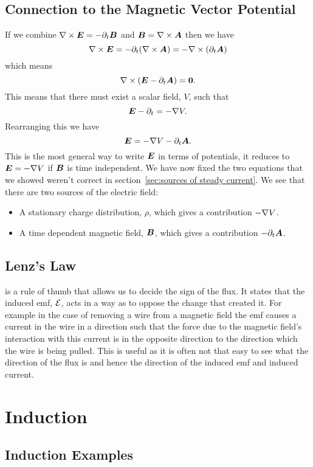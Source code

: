     \subsection{Connection to the Magnetic Vector Potential}
    If we combine \(\nabla\times\bm{E} = -\partial_t\bm{B}\) and \(\bm{B} = \nabla\times\bm{A}\) then we have
    \[\nabla\times\bm{E} = -\partial_t(\nabla\times\bm{A}) = -\nabla\times(\partial_t\bm{A})\]
    which means
    \[\nabla\times(\bm{E} - \partial_t\bm{A}) = \bm{0}.\]
    This means that there must exist a scalar field, \(V\), such that
    \[\bm{E} - \partial_t = -\nabla V.\]
    Rearranging this we have
    \[\bm{E} = -\nabla V - \partial_t\bm{A}.\]
    This is the most general way to write \(\bm{E}\) in terms of potentials, it reduces to \(\bm{E} = -\nabla V\) if \(\bm{B}\) is time independent.
    We have now fixed the two equations that we showed weren't correct in section~\ref{sec:sources of steady current}.
    We see that there are two sources of the electric field:
    \begin{itemize}
        \item A stationary charge distribution, \(\rho\), which gives a contribution \(-\nabla V\).
        \item A time dependent magnetic field, \(\bm{B}\), which gives a contribution \(-\partial_t\bm{A}\).
    \end{itemize}

    \subsection{Lenz's Law}
     is a rule of thumb that allows us to decide the sign of the flux.
    It states that the induced \gls{emf}, \(\mathcal{E}\), acts in a way as to oppose the change that created it.
    For example in the case of removing a wire from a magnetic field the \gls{emf} causes a current in the wire in a direction such that the force due to the magnetic field's interaction with this current is in the opposite direction to the direction which the wire is being pulled.
    This is useful as it is often not that easy to see what the direction of the flux is and hence the direction of the induced \gls{emf} and induced current.
    
    \section{Induction}
    \subsection{Induction Examples}
